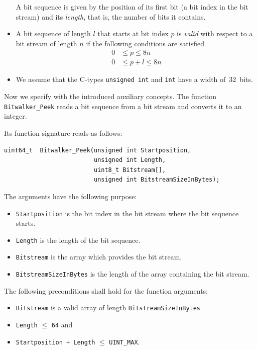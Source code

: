 \begin{itemize}
A bit sequence is given by the position of its first bit (a bit index in the bit stream)
and its \emph{length}, that is, the number of bits it contains.

\item A bit sequence of length $l$ that starts at bit index $p$ is \emph{valid}
     with respect to a bit stream of length $n$ if the following conditions are
     satisfied
     \begin{align*}
         0 &\leq p \leq 8n \\
         0 &\leq p + l \leq 8n
     \end{align*}

\item 
We assume that the C-types \texttt{unsigned int} and \texttt{int}
have a width of~32~bits.

\end{itemize}

Now we specify \peek with the introduced auxiliary concepts.
The function \texttt{Bitwalker\_Peek} reads a bit sequence from a bit stream
and converts it to an integer.

Its function signature reads as follows:

\begin{lstlisting}[style=acsl-block]
uint64_t  Bitwalker_Peek(unsigned int Startposition, 
                         unsigned int Length,
                         uint8_t Bitstream[],
                         unsigned int BitstreamSizeInBytes);
\end{lstlisting}

The arguments have the following purpose:
\begin{itemize}
    \item \texttt{Startposition} is the bit index in the bit stream 
    where the bit sequence starts.
    \item \texttt{Length} is the length of the bit sequence.
    \item \texttt{Bitstream} is the array which provides the bit stream.
    \item \texttt{BitstreamSizeInBytes} is the length of the array 
    containing the bit stream. 
\end{itemize}


The following preconditions shall hold for the function arguments:
\begin{itemize}
\item \texttt{Bitstream} is a valid array of length \verb"BitstreamSizeInBytes"

\item \texttt{Length} $\leq$ \texttt{64} and

\item \texttt{Startposition + Length} $\leq$ \verb"UINT_MAX".
\end{itemize}

